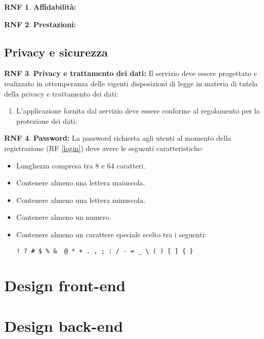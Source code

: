 \documentclass[11pt, a4paper]{article}
\theoremstyle{definition}
\newtheorem{nonfuncreq}{RNF} %
\begin{document}
\begin{nonfuncreq}
\textbf{Affidabilità:}

\end{nonfuncreq}

\begin{nonfuncreq}
\textbf{Prestazioni:}
\end{nonfuncreq}

\subsection{Privacy e sicurezza}

\begin{nonfuncreq}
\textbf{Privacy e trattamento dei dati:}
Il servizio deve essere progettato e realizzato in ottemperanza delle
vigenti disposizioni di legge in materia di tutela della privacy e
trattamento dei dati:
\begin{enumerate}
    \item L'applicazione fornita dal servizio deve essere conforme
    al regolamento \href{https://www.garanteprivacy.it/documents/10160/0/Regolamento+UE+2016+679.+Arricchito+con+riferimenti+ai+Considerando+Aggiornato+alle+rettifiche+pubblicate+sulla+Gazzetta+Ufficiale++dell%27Unione+europea+127+del+23+maggio+2018}{\textcolor{blue}{\underbar{UE n.2016/679}}} per la protezione dei dati.
\end{enumerate}
\end{nonfuncreq}

\begin{nonfuncreq}
\textbf{Password:}
La password richiesta agli utenti al momento della registrazione
(RF \ref{login}) deve avere le seguenti caratteristiche:
\begin{itemize}
    \item Lunghezza compresa tra 8 e 64 caratteri.
    \item Contenere almeno una lettera maiuscola.
    \item Contenere almeno una lettera minuscola.
    \item Contenere almeno un numero.
    \item Contenere almeno un carattere speciale scelto tra i
    seguenti:
    \begin{center}
        \verb|! ? # $ % &  @ * + . , ; : / - = _ \ ( ) [ ] { }|
    \end{center}
\end{itemize}
\end{nonfuncreq}



\newpage
\section{Design front-end}

\section{Design back-end}
\end{document}
